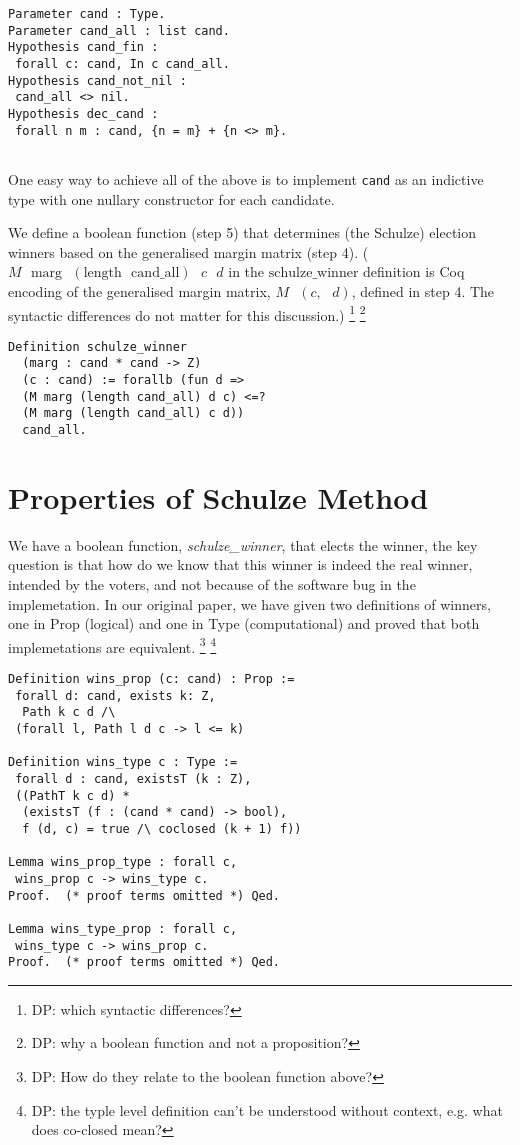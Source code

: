 \documentclass[compsoc,conference,a4paper,10pt,times]{IEEEtran}
\begin{document}
 \begin{verbatim}
Parameter cand : Type.
Parameter cand_all : list cand.
Hypothesis cand_fin : 
 forall c: cand, In c cand_all.
Hypothesis cand_not_nil : 
 cand_all <> nil.
Hypothesis dec_cand : 
 forall n m : cand, {n = m} + {n <> m}.


\end{verbatim}

One easy way to achieve all of the above is to implement
\texttt{cand} as an indictive type with one nullary constructor for
each candidate.

We define a boolean function (step 5) that determines 
(the Schulze) election winners based on 
the generalised margin matrix (step 4). ($M \text{ } \mathrm{marg} \text{ } 
(\mathrm{length} \text{ } \mathrm{cand\_all}) \text{ } c \text{ } d$ 
in the $\mathrm{schulze\_winner}$ definition is Coq encoding of the generalised margin matrix, 
$M \text{ } (c, \text{ }d)$, defined in step 4. The syntactic differences do not matter 
for this discussion.)
\footnote{DP: which syntactic differences?}
\footnote{DP: why a boolean function and not a proposition?}
 \begin{verbatim}
Definition schulze_winner 
  (marg : cand * cand -> Z) 
  (c : cand) := forallb (fun d => 
  (M marg (length cand_all) d c) <=? 
  (M marg (length cand_all) c d))
  cand_all.
\end{verbatim}


\section{Properties of Schulze Method}
	 We have a boolean function,  \textit{schulze\_winner},  that 
	 elects the winner,  the key question is that how do we know that 
	 this winner is indeed the real winner,  intended by the voters, and 
	 not because of the software bug in the implemetation.  In our 
	 original paper, we have given two definitions of 
	 winners, one in Prop (logical) and one in Type (computational) and 
	 proved that both implemetations are equivalent. 
   \footnote{DP: How do they relate to the boolean function above?}
   \footnote{DP: the typle level definition can't be understood
   without context, e.g. what does co-closed mean?}
	  
\begin{verbatim}
Definition wins_prop (c: cand) : Prop := 
 forall d: cand, exists k: Z,
  Path k c d /\ 
 (forall l, Path l d c -> l <= k)
	 
Definition wins_type c : Type :=
 forall d : cand, existsT (k : Z),
 ((PathT k c d) *
  (existsT (f : (cand * cand) -> bool), 
  f (d, c) = true /\ coclosed (k + 1) f))
  
Lemma wins_prop_type : forall c, 
 wins_prop c -> wins_type c.
Proof.  (* proof terms omitted *) Qed. 

Lemma wins_type_prop : forall c, 
 wins_type c -> wins_prop c.  
Proof.  (* proof terms omitted *) Qed. 	 
\end{verbatim}
\end{document}
